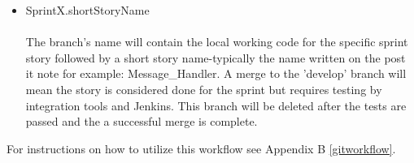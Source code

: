 \begin{itemize}
\item SprintX.shortStoryName\\ \\
The branch's name will contain the local working code for the specific sprint story followed by a short story name-typically the name written on the post it note for example: Message\_Handler. A merge to the 'develop' branch will mean the story is considered done for the sprint but requires testing by integration tools and Jenkins. This branch will be deleted after the tests are passed and the a successful merge is complete.
\end{itemize}

For instructions on how to utilize this workflow see Appendix B \ref{gitworkflow}.
